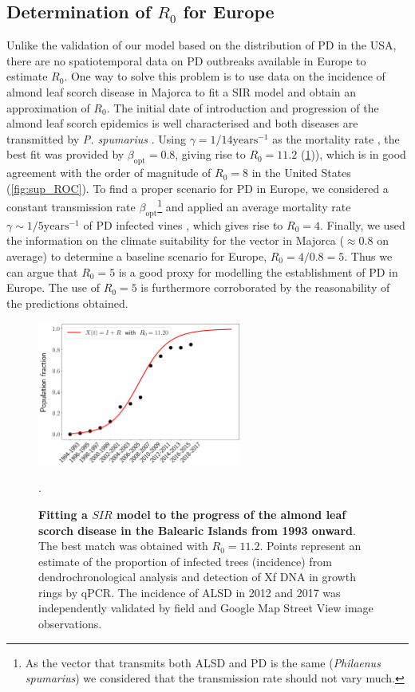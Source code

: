 \subsection{Determination of $R_0$ for Europe}\label{app:R0_Europe}

Unlike the validation of our model based on the distribution of PD in the
USA, there are no spatiotemporal data on PD outbreaks available in Europe to
estimate $R_0$. One way to solve this problem is to use data on the incidence
of almond leaf scorch disease in Majorca to fit a SIR model and obtain an
approximation of $R_0$. The initial date of introduction and progression of the
almond leaf scorch epidemics is well characterised and both diseases are
transmitted by \textit{P. spumarius} \cite{Moralejo2019,Moralejo2020}. Using
$\gamma=1/14 \textrm{years}^{-1}$ as the mortality rate \cite{Moralejo2020},
the best fit was provided by $\beta_{\textrm{opt}}=0.8$, giving rise to
$R_0=11.2$ (\cref{fig:sup_R0_Europe})), which is in good agreement with the
order of magnitude of $R_0=8$
in the United States (\cref{fig:sup_ROC}). To find a proper scenario for PD in
Europe, we considered a constant transmission rate
$\beta_{\textrm{opt}}$\footnote{As the vector that transmits both ALSD and PD
    is the same (\textit{Philaenus spumarius}) we considered that the
    transmission
    rate should not vary much.} and applied an average mortality rate
$\gamma\sim
    1/5 \textrm{years}^{-1}$ of PD infected vines \cite{Purcell2013}, which
gives
rise to $R_0=4$. Finally, we used the information on the climate suitability
for the vector in Majorca ($\approx0.8$ on average) to determine a baseline
scenario for Europe, $R_0=4/0.8=5$. Thus we can argue that $R_0=5$ is a good
proxy for modelling the establishment of PD in Europe. The use of $R_0=5$ is
furthermore corroborated by the reasonability of the predictions obtained.

\begin{figure}[H]
    \centering
    \includegraphics[width=0.6\textwidth]{Figures/R0_xylella.png}
    \caption[Fit of an SIR model to ALSD data]{\textbf{Fitting a $SIR$ model to
            the progress of the almond
            leaf scorch disease in the Balearic Islands from 1993 onward}. The
        best match
        was obtained with $R_0= 11.2$. Points represent an estimate of the
        proportion
        of infected trees (incidence) from dendrochronological analysis and
        detection
        of Xf DNA in growth rings by qPCR. The incidence of ALSD in 2012 and
        2017 was
        independently validated by field and Google Map Street View image
        observations.}.
    \label{fig:sup_R0_Europe} %
\end{figure}

